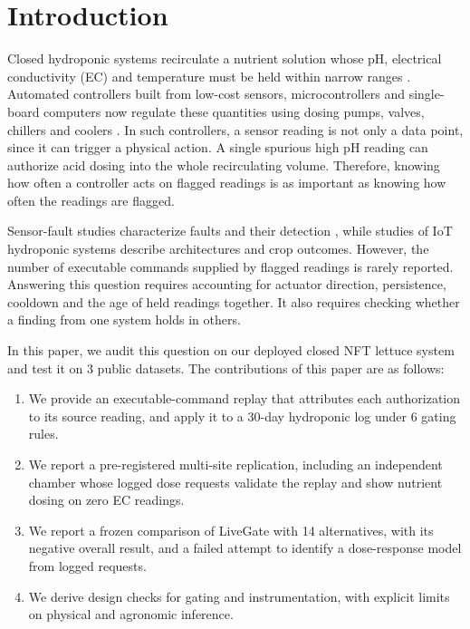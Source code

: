 \documentclass[preprint,12pt,doubleblind]{elsarticle}
\begin{document}
\section{Introduction}
\label{sec:intro}
Closed hydroponic systems recirculate a nutrient solution whose pH, electrical conductivity (EC) and temperature must be held within narrow ranges \cite{niu2022hydroponics,asaduzzaman2022nutrients}. Automated controllers built from low-cost sensors, microcontrollers and single-board computers now regulate these quantities using dosing pumps, valves, chillers and coolers \cite{domingues2012automated,tatas2022reliable}. In such controllers, a sensor reading is not only a data point, since it can trigger a physical action. A single spurious high pH reading can authorize acid dosing into the whole recirculating volume. Therefore, knowing how often a controller acts on flagged readings is as important as knowing how often the readings are flagged.

Sensor-fault studies characterize faults and their detection \cite{ni2009faulttypes,sharma2010sensorfaults,teh2020sensorquality,zou2023agriiotfaults}, while studies of IoT hydroponic systems describe architectures and crop outcomes. However, the number of executable commands supplied by flagged readings is rarely reported. Answering this question requires accounting for actuator direction, persistence, cooldown and the age of held readings together. It also requires checking whether a finding from one system holds in others.

In this paper, we audit this question on our deployed closed NFT lettuce system and test it on 3 public datasets. The contributions of this paper are as follows:
\begin{enumerate}
\item We provide an executable-command replay that attributes each authorization to its source reading, and apply it to a 30-day hydroponic log under 6 gating rules.
\item We report a pre-registered multi-site replication, including an independent chamber whose logged dose requests validate the replay and show nutrient dosing on zero EC readings.
\item We report a frozen comparison of LiveGate with 14 alternatives, with its negative overall result, and a failed attempt to identify a dose-response model from logged requests.
\item We derive design checks for gating and instrumentation, with explicit limits on physical and agronomic inference.
\end{enumerate}
\end{document}
